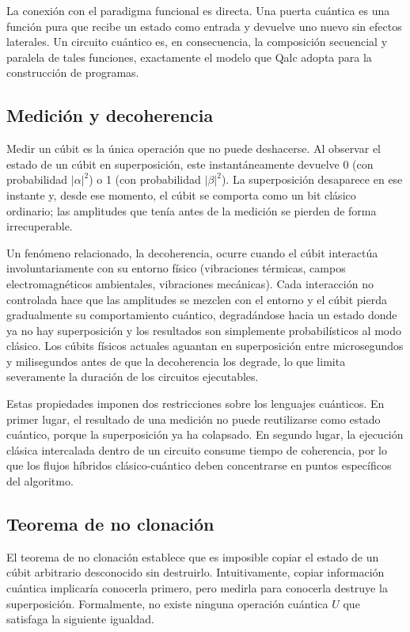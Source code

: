 La conexión con el paradigma funcional es directa. Una puerta cuántica es una función pura que recibe un estado como entrada y devuelve uno nuevo sin efectos laterales. Un circuito cuántico es, en consecuencia, la composición secuencial y paralela de tales funciones, exactamente el modelo que Qalc adopta para la construcción de programas.

\subsection{Medición y decoherencia}
\label{subsec:medicion}

Medir un cúbit es la única operación que no puede deshacerse. Al observar el estado de un cúbit en superposición, este instantáneamente devuelve 0 (con probabilidad $|\alpha|^2$) o 1 (con probabilidad $|\beta|^2$). La superposición desaparece en ese instante y, desde ese momento, el cúbit se comporta como un bit clásico ordinario; las amplitudes que tenía antes de la medición se pierden de forma irrecuperable.

Un fenómeno relacionado, la decoherencia, ocurre cuando el cúbit interactúa involuntariamente con su entorno físico (vibraciones térmicas, campos electromagnéticos ambientales, vibraciones mecánicas). Cada interacción no controlada hace que las amplitudes se mezclen con el entorno y el cúbit pierda gradualmente su comportamiento cuántico, degradándose hacia un estado donde ya no hay superposición y los resultados son simplemente probabilísticos al modo clásico. Los cúbits físicos actuales aguantan en superposición entre microsegundos y milisegundos antes de que la decoherencia los degrade, lo que limita severamente la duración de los circuitos ejecutables.

Estas propiedades imponen dos restricciones sobre los lenguajes cuánticos. En primer lugar, el resultado de una medición no puede reutilizarse como estado cuántico, porque la superposición ya ha colapsado. En segundo lugar, la ejecución clásica intercalada dentro de un circuito consume tiempo de coherencia, por lo que los flujos híbridos clásico-cuántico deben concentrarse en puntos específicos del algoritmo.

\subsection{Teorema de no clonación}
\label{subsec:noclonacion}

El teorema de no clonación establece que es imposible copiar el estado de un cúbit arbitrario desconocido sin destruirlo. Intuitivamente, copiar información cuántica implicaría conocerla primero, pero medirla para conocerla destruye la superposición. Formalmente, no existe ninguna operación cuántica $U$ que satisfaga la siguiente igualdad.

